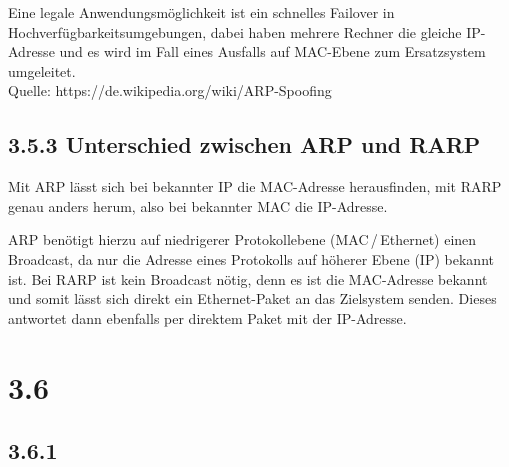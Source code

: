 \documentclass[a4paper,
			llpt,
			solution,
			accentcolor=tud2d,
			colorbacktitle
			]
			{tudexercise}
\newcommand{\8}{$\infty$}
\begin{document}
Eine legale Anwendungsmöglichkeit ist ein schnelles Failover in Hochverfügbarkeitsumgebungen, dabei haben mehrere Rechner die gleiche IP-Adresse und es wird im Fall eines Ausfalls auf MAC-Ebene zum Ersatzsystem umgeleitet.
\\
Quelle: https://de.wikipedia.org/wiki/ARP-Spoofing


\subsection{3.5.3 Unterschied zwischen ARP und RARP}

Mit ARP lässt sich bei bekannter IP die MAC-Adresse herausfinden, mit RARP genau anders herum, also bei bekannter MAC die IP-Adresse.

ARP benötigt hierzu auf niedrigerer Protokollebene (MAC\,/\,Ethernet) einen
Broadcast, da nur die Adresse eines Protokolls auf höherer Ebene (IP) bekannt ist. Bei RARP ist kein Broadcast nötig, denn es ist die MAC-Adresse bekannt und somit lässt sich direkt ein Ethernet-Paket an das Zielsystem senden. Dieses antwortet dann ebenfalls per direktem Paket mit der IP-Adresse.
\clearpage
\section{3.6}
\subsection{3.6.1}
\end{document}
